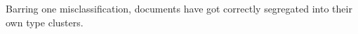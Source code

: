 \documentclass[journal]{journal}
\begin{document}
Barring one misclassification, documents have got correctly segregated into their own type
clusters.








\end{document}
